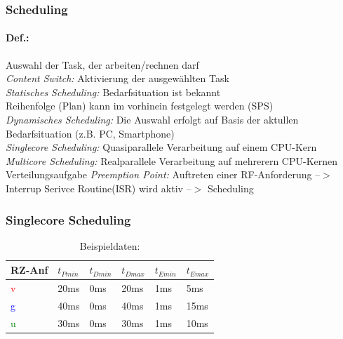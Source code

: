 \documentclass[12pt,a4paper,oneside,ngerman]{article}
\begin{document}
\subsubsection{Scheduling}
\paragraph{Def.:}
Auswahl der Task, der arbeiten/rechnen darf \\
\emph{Content Switch:} Aktivierung der ausgewählten Task \\
\emph{Statisches Scheduling:} Bedarfsituation ist bekannt \\
 Reihenfolge (Plan) kann im vorhinein festgelegt werden (SPS)\\
\emph{Dynamisches Scheduling:} Die Auswahl erfolgt auf Basis der aktullen Bedarfsituation (z.B. PC, Smartphone)\\
\emph{Singlecore Scheduling:} Quasiparallele Verarbeitung auf einem CPU-Kern\\
\emph{Multicore Scheduling:} Realparallele Verarbeitung auf mehrerern CPU-Kernen\\
 Verteilungsaufgabe
\emph{Preemption Point:} Auftreten einer RF-Anforderung --$>$ Interrup Serivce Routine(ISR) wird aktiv --$>$ Scheduling

\subsubsection{Singlecore Scheduling}
\begin{table}[H]
	\caption{Beispieldaten:}
	\begin{tabular}{|l|l|l|l|l|l|}
	\hline
	RZ-Anf & \(t_{Pmin}\) & \(t_{Dmin}\) & \(t_{Dmax}\) & \(t_{Emin}\) & \(t_{Emax}\) \\ \hline
	\textcolor{red}{v}      & 20ms         & 0ms          & 20ms         & 1ms          & 5ms          \\ \hline
	\textcolor{blue}{g}      & 40ms         & 0ms          & 40ms         & 1ms          & 15ms         \\ \hline
	\textcolor{green}{u}      & 30ms         & 0ms          & 30ms         & 1ms          & 10ms         \\ \hline
	\end{tabular}
\end{table}
\end{document}
